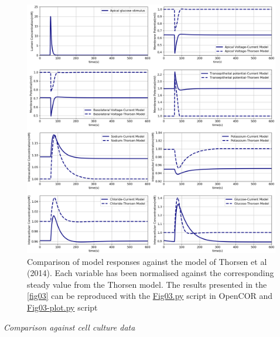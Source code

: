 \documentclass[fleqn,10pt]{physiome}
\begin{document}
\begin{figure}[ht]
\centering
\includegraphics[width=0.8\linewidth]{fig03.png}
\caption{Comparison of model responses against the model
of Thorsen et al (2014). Each variable has been normalised
against the corresponding steady value from the Thorsen model. The results presented in the \autoref{fig03} can be reproduced with the \href{https://models.physiomeproject.org/workspace/572/file/59488c15178b09bcb5b11f795383b1435f7b7ef1/SEDML_files/Fig03.py}{Fig03.py} script in OpenCOR and \href{https://models.physiomeproject.org/workspace/572/file/59488c15178b09bcb5b11f795383b1435f7b7ef1/SEDML_files/Fig03-plot.py}{Fig03-plot.py} script}
\label{fig03}
\end{figure}

\textit{Comparison against cell culture data}\newline
\end{document}
